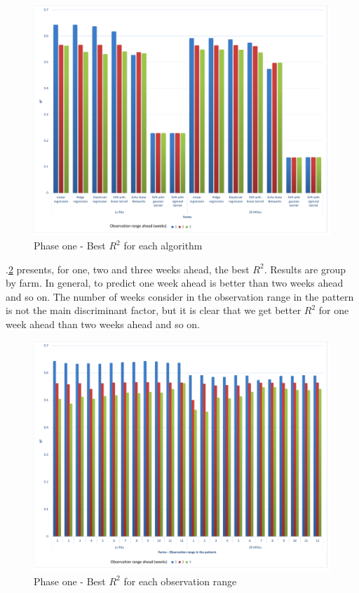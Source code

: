 \documentclass[review,authoryear,english]{elsarticle}
\begin{document}
\begin{figure}[H] 
 \centering
 \includegraphics[scale=.5]{Phase_one_Best_R2_for_each_algortihm}
 \caption{Phase one - Best $R^2$ for each algorithm} 
 \label{figura4} 
\end{figure}

\figurename $.$\ref{figura5} presents, for one, two and three weeks ahead, the best $R^2$. Results are group by farm. In general, to predict one week ahead is better than two weeks ahead and so on. The number of weeks consider in the observation range in the pattern is not the main discriminant factor, but it is clear that we get better $R^2$ for one week ahead than two weeks ahead and so on.

\begin{figure}[H] 
 \centering
 \includegraphics[scale=.5]{Phase_one_Best_R2_for_each_number_of_observation_range_in_the_patterm}
 \caption{Phase one - Best $R^2$ for each observation range} 
 \label{figura5} 
\end{figure}
\end{document}
